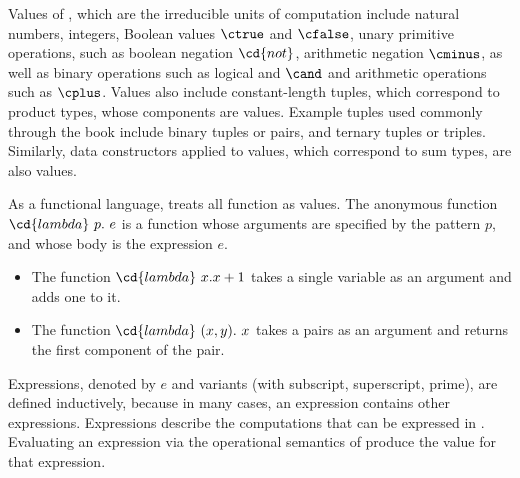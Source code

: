 \begin{cluster}
\label{grp:grm:sparc::values}

\begin{gram}[Values]
\label{grm:sparc::values}
Values of \pml, which are the irreducible units of computation
include natural numbers, integers, Boolean values $\ctrue$ and $\cfalse$,
unary primitive operations, such as boolean negation $\cd{not}$,
arithmetic negation $\cminus$, as well as binary operations such as
logical and $\cand$ and arithmetic operations such as $\cplus$.
Values also include constant-length tuples, which correspond to
product types, whose components are values.
Example tuples used commonly through the book include binary tuples or
pairs, and ternary tuples or triples.
Similarly, data constructors applied to values, which correspond to
sum types, are also values.

As a functional language, \pml treats all function as values. 
The anonymous function
$\cd{lambda}~p.~e$
is a function whose arguments are specified by the pattern $p$, and
whose body is the expression $e$.

\end{gram}
\end{cluster}

\begin{cluster}
\label{grp:xmpl:sparc::function}

\begin{example}
\label{xmpl:sparc::function}
\begin{itemize}

\item

The function 
$\cd{lambda}~x. x + 1$ takes a single variable as an argument and
adds one to it.

\item
The function 
$\cd{lambda}~(x,y).~x$ takes a pairs as an argument and
returns the first component of the pair.
\end{itemize}

\end{example}
\end{cluster}

\begin{cluster}
\label{grp:grm:sparc::expressions}

\begin{gram}[Expressions]
\label{grm:sparc::expressions}
Expressions, denoted by $e$ and variants (with subscript, superscript,
prime), are defined inductively, because in many cases, an expression
contains other expressions.
Expressions describe the computations that can be expressed in \pml. 
Evaluating an expression via the operational semantics of \pml
produce the value for that expression.

\end{gram}
\end{cluster}

